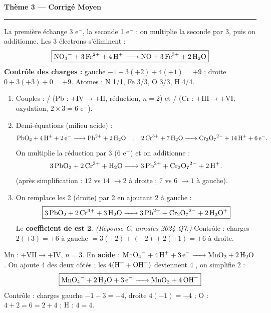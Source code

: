 \documentclass[11pt,a4paper]{article}
\begin{document}
\begin{center}
{\LARGE\bfseries\color{primarydark}Thème 3 — Corrigé Moyen}\\[-2pt]
{\color{corrcol}\rule{\textwidth}{1pt}}
\end{center}

\begin{corr}
La première échange 3 e$^-$, la seconde 1 e$^-$ : on multiplie la seconde par 3, puis on additionne.
Les 3 électrons s'éliminent :
\[
\boxed{\ce{NO3^- + 3 Fe^{2+} + 4 H+ -> NO + 3 Fe^{3+} + 2 H2O}}
\]
\textbf{Contrôle des charges :} gauche $-1 + 3(+2) + 4(+1) = +9$ ; droite $0 + 3(+3) + 0 = +9$. \checkmark
Atomes : N 1/1, Fe 3/3, O 3/3, H 4/4. \checkmark
\end{corr}

\begin{corr}
\begin{enumerate}[label=(\alph*),leftmargin=2em,topsep=1pt,itemsep=1.5pt]
  \item Couples : / (Pb : $+\mathrm{IV}\to+\mathrm{II}$, réduction, $n=2$) et
        / (Cr : $+\mathrm{III}\to+\mathrm{VI}$, oxydation, $2\times3=6$ e$^-$).
  \item Demi-équations (milieu acide) :
        \[
        \ce{PbO2 + 4 H+ + 2 e^- -> Pb^{2+} + 2 H2O} \quad ; \quad
        \ce{2 Cr^{3+} + 7 H2O -> Cr2O7^{2-} + 14 H+ + 6 e^-}.
        \]
        On multiplie la réduction par 3 (6 e$^-$) et on additionne :
        \[
        \ce{3 PbO2 + 2 Cr^{3+} + H2O -> 3 Pb^{2+} + Cr2O7^{2-} + 2 H+}.
        \]
        (après simplification : $12$ vs $14$  $\to 2$  à droite ; $7$ vs $6$  $\to 1$ à gauche).
  \item On remplace les 2  (droite) par 2  en ajoutant 2  à gauche :
        \[
        \boxed{\ce{3 PbO2 + 2 Cr^{3+} + 3 H2O -> 3 Pb^{2+} + Cr2O7^{2-} + 2 H3O+}}
        \]
        Le \textbf{coefficient de  est 2}. \emph{(Réponse C, annales 2024-Q7.)}
        Contrôle : charges $2(+3)=+6$ à gauche $=3(+2)+(-2)+2(+1)=+6$ à droite. \checkmark
\end{enumerate}
\end{corr}

\begin{corr}
Mn : $+\mathrm{VII}\to+\mathrm{IV}$, $n=3$. En \textbf{acide} :
$\ce{MnO4^- + 4 H+ + 3 e^- -> MnO2 + 2 H2O}$. On ajoute 4  des deux côtés ; les
$4(\ce{H+}+\ce{OH^-})$ deviennent 4 , on simplifie 2  :
\[
\boxed{\ce{MnO4^- + 2 H2O + 3 e^- -> MnO2 + 4 OH^-}}
\]
Contrôle : charges gauche $-1-3=-4$, droite $4(-1)=-4$ \checkmark ; O : $4+2=6=2+4$ ; H : $4=4$. \checkmark
\end{corr}
\end{document}
